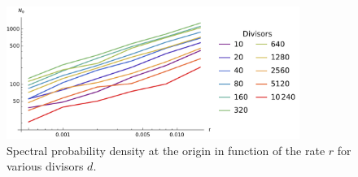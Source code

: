\documentclass[a4paper,12pt,reqno,superscriptaddress,nofootinbib]{revtex4}
\theoremstyle{plain}
\theoremstyle{definition}
\theoremstyle{remark}
\newcommand{\0}{^{(0)}}
\newcommand{\1}{^{(1)}}
\newcommand{\2}{^{(2)}}
\begin{document}
%	
%	

\begin{figure}[th!]
	\includegraphics[width=0.85\textwidth]{near-divisors.pdf}
	\caption{Spectral probability density at the origin in function of the rate $r$ for various divisors $d$.}\label{fig:near-divisors}
\end{figure}
\end{document}
